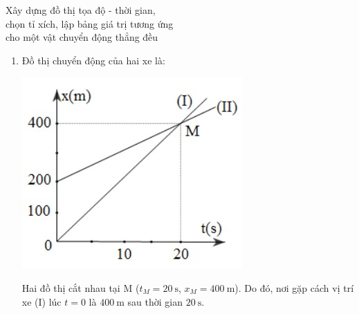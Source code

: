 \begin{dang}{Xây dựng đồ thị tọa độ - thời gian,\\ chọn tỉ xích, lập bảng giá trị tương ứng \\cho một vật chuyển động thẳng đều}
{\begin{enumerate}[label=\alph*)]
			Phương trình chuyển động của vật (II) là:
			\begin{equation*}
				x_\text{(II)}=x_{0\text{(II)}} + v_\text{(II)}t = 200+10t\textrm{ (m, s)}.
			\end{equation*}
			\item
			Đồ thị chuyển động của hai xe là:
			\begin{center}
				\includegraphics[scale=0.8]{../figs/VN10-PH-03-L-002-4-V2-02.jpg}
			\end{center}
			Hai đồ thị cắt nhau tại M ($t_M=\SI{20}{\second}$, $x_M=\SI{400}{\meter}$). Do đó, nơi gặp cách vị trí xe (I) lúc $t=0$ là $\SI{400}{\meter}$ sau thời gian $\SI{20}{\second}$.
		\end{enumerate}	
	}
\end{dang}
